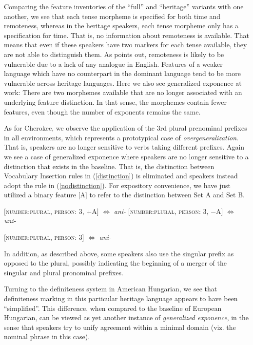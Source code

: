 \documentclass[output=paper,colorlinks,citecolor=brown,footheight=42pt]{langscibook}
\begin{document}
Comparing the feature inventories of the “full” and “heritage” variants with one another, we see that each tense morpheme is specified for both time and remoteness, whereas in the heritage speakers, each tense morpheme only has a specification for time. That is, no information about remoteness is available. That means that even if these speakers have two markers for each tense available, they are not able to distinguish them. As \citet[45]{sherkinalieber2015} points out, remoteness is likely to be vulnerable due to a lack of any analogue in English. Features of a weaker language which have no counterpart in the dominant language tend to be more vulnerable across heritage languages. Here we also see generalized exponence at work: There are two morphemes available that are no longer associated with an underlying feature distinction. In that sense, the morphemes contain fewer features, even though the number of exponents remains the same.

As for Cherokee, we observe the application of the 3rd plural prenominal prefixes in all environments, which represents a prototypical case of \textit{overgeneralization}. That is, speakers are no longer sensitive to verbs taking different prefixes. Again we see a case of generalized exponence where speakers are no longer sensitive to a distinction that exists in the baseline. That is, the distinction between Vocabulary Insertion rules in (\ref{distinction}) is eliminated and speakers instead adopt the rule in (\ref{nodistinction}). For expository convenience, we have just utilized a binary feature [\pm A] to refer to the distinction between Set A and Set B.

\begin{exe}
\ex\label{distinction} 
\begin{xlist}
\ex $[$\textsc{number:plural, person: 3, +A}$]$ $\Longleftrightarrow$ {\itshape ani-}
\ex $[$\textsc{number:plural, person: 3, −A}$]$ $\Longleftrightarrow$ {\itshape uni-}
\end{xlist}
\ex\label{nodistinction} $[$\textsc{number:plural, person: 3}$]$ $\Longleftrightarrow$ {\itshape ani-}
\end{exe}

\noindent
In addition, as described above, some speakers also use the singular prefix as opposed to the plural, possibly indicating the beginning of a merger of the singular and plural pronominal prefixes.

Turning to the definiteness system in American Hungarian, we see that definiteness marking in this particular heritage language appears to have been “simplified”. This difference, when compared to the baseline of European Hungarian, can be viewed as yet another instance of \textit{generalized exponence}, in the sense that speakers try to unify agreement within a minimal domain (viz. the nominal phrase in this case).
\end{document}

